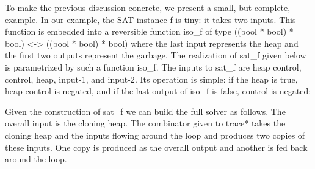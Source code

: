 \documentclass{llncs}
\begin{document}
To make the previous discussion concrete, we present a small, but
complete, example. In our example, the SAT instance {{f}} is tiny: it
takes two inputs. This function is embedded into a reversible function
{{iso_f}} of type 
{{((bool * bool) * bool) <-> ((bool * bool) * bool)}} where the last
input represents the heap and the first two outputs represent the garbage. 
The realization of {{sat_f}} given below is parametrized by such 
a function {{iso_f}}. The inputs to {{sat_f}} are 
\textsf{heap control}, \textsf{control}, \textsf{heap}, \textsf{input-1}, and 
\textsf{input-2}. Its operation is simple: if the \textsf{heap} is {{true}}, 
\textsf{heap control} is negated, and if the last output of {{iso_f}} 
is {{false}}, \textsf{control} is negated:


Given the construction of {{sat_f}} we can build the full solver as
follows. The overall input is the cloning heap. The combinator given
to {{trace*}} takes the cloning heap and the inputs flowing around the
loop and produces two copies of these inputs. One copy is produced as
the overall output and another is fed back around the loop. 

\end{document}
